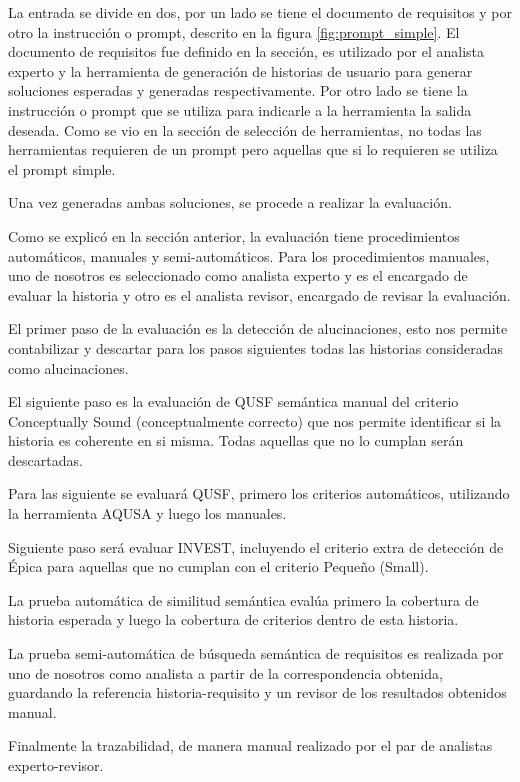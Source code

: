 La entrada se divide en dos, por un lado se tiene el documento de requisitos y por otro la instrucción o prompt, descrito en la figura \ref{fig:prompt_simple}.
El documento de requisitos fue definido en la sección, es utilizado por el analista experto y la herramienta de generación de historias de usuario para generar soluciones esperadas y generadas respectivamente. Por otro lado se tiene la instrucción o prompt que se utiliza para indicarle a la herramienta la salida deseada. Como se vio en la sección de selección de herramientas, no todas las herramientas requieren de un prompt pero aquellas que si lo requieren se utiliza el prompt simple. %

Una vez generadas ambas soluciones, se procede a realizar la evaluación.

Como se explicó en la sección anterior, la evaluación tiene procedimientos automáticos, manuales y semi-automáticos. Para los procedimientos manuales, uno de nosotros es seleccionado como analista experto y es el encargado de evaluar la historia y otro es el analista revisor, encargado de revisar la evaluación.

El primer paso de la evaluación es la detección de alucinaciones, esto nos permite contabilizar y descartar para los pasos siguientes todas las historias consideradas como alucinaciones.

El siguiente paso es la evaluación de QUSF semántica manual del criterio Conceptually Sound (conceptualmente correcto) que nos permite identificar si la historia es coherente en si misma. Todas aquellas que no lo cumplan serán descartadas.

Para las siguiente se evaluará QUSF, primero los criterios automáticos, utilizando la herramienta AQUSA \cite{aqusa} y luego los manuales. 

Siguiente paso será evaluar INVEST, incluyendo el criterio extra de detección de Épica para aquellas que no cumplan con el criterio Pequeño (Small).

La prueba automática de similitud semántica evalúa primero la cobertura de historia esperada y luego la cobertura de criterios dentro de esta historia.

La prueba semi-automática de búsqueda semántica de requisitos es realizada por uno de nosotros como analista a partir de la correspondencia obtenida, guardando la referencia historia-requisito y un revisor de los resultados obtenidos manual.

Finalmente la trazabilidad, de manera manual realizado por el par de analistas experto-revisor.